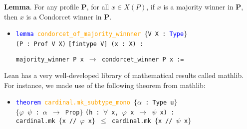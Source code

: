 \documentclass[12pt,xcolor=svgnames,blue,aspectratio=169]{beamer}
\begin{document}
\begin{frame}

{\bf Lemma}. For any profile  $\mathbf{P}$, for all $x\in X(P)$, if $x$ is a majority winner in $\mathbf{P}$, then $x$ is a Condorcet winner  in $\mathbf{P}$. 

\vfill 
\begin{itemize}
\item[] \texttt{\textcolor{blue}{lemma} \textcolor{orange}{condorcet\_of\_majority\_winnner} $\{$V X : \textcolor{blue}{Type}$\}$\\ (P : Prof V X)}
\texttt{[fintype V] (x : X) :}

 \texttt{majority\_winner P x $\to$ condorcet\_winner P x :=}

\end{itemize}


\end{frame}


\begin{frame}

Lean has a very well-developed library of mathematical results called mathlib.   For instance, we made  use of the following theorem from mathlib: 

\bigskip

\begin{itemize}
\item[] \texttt{\textcolor{blue}{theorem} \textcolor{orange}{cardinal.mk\_subtype\_mono} $\{$$\alpha$ : Type u$\}$\\ $\{$$\varphi$ $\psi$ : $\alpha$ $\to$ Prop$\}$} 
\texttt{(h : $\forall$ x, $\varphi$ x $\to$ $\psi$ x) :} \\\texttt{cardinal.mk $\{$x // $\varphi$ x$\}$ $\leq$ cardinal.mk $\{$x // $\psi$ x$\}$}
\end{itemize}
\end{frame}
\end{document}
